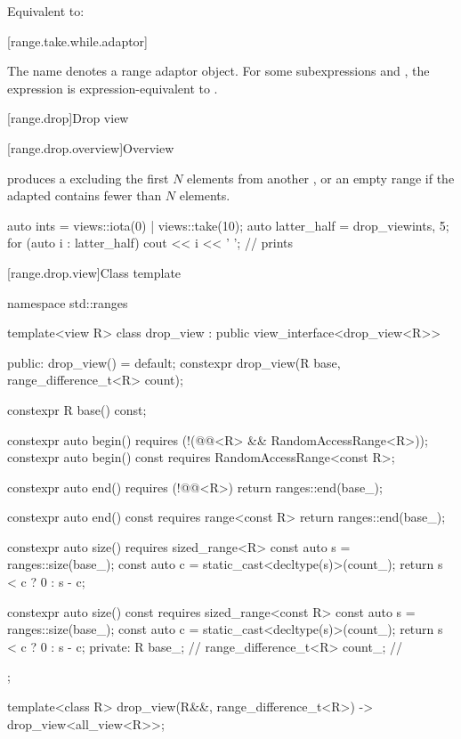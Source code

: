 \begin{itemdescr}
\pnum
\effects
Equivalent to:
\end{itemdescr}

[range.take.while.adaptor]{}

%
\pnum
The name  denotes
a range adaptor object.
For some subexpressions  and ,
the expression 
is expression-equivalent to .

[range.drop]{Drop view}

[range.drop.overview]{Overview}

\pnum
{} produces a 
excluding the first $N$ elements from another , or
an empty range if the adapted  contains fewer than $N$ elements.

\pnum
\begin{example}
\begin{codeblock}
auto ints = views::iota(0) | views::take(10);
auto latter_half = drop_view{ints, 5};
for (auto i : latter_half) {
  cout << i << ' ';                             // prints 
}
\end{codeblock}
\end{example}

[range.drop.view]{Class template }

%
\begin{codeblock}
namespace std::ranges {
  template<view R>
  class drop_view : public view_interface<drop_view<R>> {
  public:
    drop_view() = default;
    constexpr drop_view(R base, range_difference_t<R> count);

    constexpr R base() const;

    constexpr auto begin()
      requires (!(@@<R> && RandomAccessRange<R>));
    constexpr auto begin() const
      requires RandomAccessRange<const R>;

    constexpr auto end()
      requires (!@@<R>)
    { return ranges::end(base_); }

    constexpr auto end() const
      requires range<const R>
    { return ranges::end(base_); }

    constexpr auto size()
      requires sized_range<R>
    {
      const auto s = ranges::size(base_);
      const auto c = static_cast<decltype(s)>(count_);
      return s < c ? 0 : s - c;
    }

    constexpr auto size() const
      requires sized_range<const R>
    {
      const auto s = ranges::size(base_);
      const auto c = static_cast<decltype(s)>(count_);
      return s < c ? 0 : s - c;
    }
  private:
    R base_;                                    // \expos
    range_difference_t<R> count_;               // \expos
  };

  template<class R>
    drop_view(R&&, range_difference_t<R>) -> drop_view<all_view<R>>;
}
\end{codeblock}

